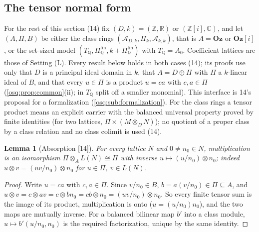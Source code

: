 \documentclass[11pt,letterpaper]{article}
\numberwithin{equation}{section}
\newtheorem{lemma}[lemma]{Lemma}
\theoremstyle{definition}
\theoremstyle{remark}
\theoremstyle{plain}
\newcommand{\Oz}{\mathbf{Oz}}
\newcommand{\GOz}{\Oz[i]}
\newcommand{\Z}{\mathbb Z}
\newcommand{\Q}{\mathbb Q}
\newcommand{\R}{\mathbb R}
\newcommand{\C}{\mathbb C}
\newcommand{\A}{\mathcal A}          %
\newcommand{\src}[1]{\textup{\textsf{[#1]}}}
\begin{document}
\subsection{The tensor normal form}\label{osq:tn:sub:tensor}

For the rest of this section (14) fix $(D,k)=(\Z,\R)$ or $(\Z[i],\C)$, and let $(A,\Pi,B)$ be either the class rings
$(\A_{D,k},\Pi_k,\A_{k,k})$, that is $A=\Oz$ or $\GOz$, or the set-sized model $(T_\Q,\Pi^{\mathrm{fin}}_\Q,k+\Pi^{\mathrm{fin}}_\Q)$
with $T_\Q=A_0$. Coefficient lattices are those of Setting (L). Every result below holds in both cases (14); its proofs use
only that $D$ is a principal ideal domain in $k$, that $A=D\oplus\Pi$ with $\Pi$ a $k$-linear ideal of $B$, and that every
$u\in\Pi$ is a product $u=ca$ with $c,a\in\Pi$ (\cref{osq:prop:common}(ii); in $T_\Q$ split off a smaller monomial). This
interface is 14's proposal for a formalization (\cref{osq:sub:formalization}). For the class rings a tensor product means an
explicit carrier with the balanced universal property proved by finite identities (for two lattices,
$\Pi\times(M\otimes_DN)$); no quotient of a proper class by a class relation and no class colimit is used (14).

\begin{lemma}[Absorption \src{14}]\label{osq:tn:lem:absorption}
For every lattice $N$ and $0\ne n_0\in N$, multiplication is an isomorphism $\Pi\otimes_AL(N)\cong\Pi$ with inverse
$u\mapsto(u/n_0)\otimes n_0$; indeed $u\otimes v=(uv/n_0)\otimes n_0$ for $u\in\Pi$, $v\in L(N)$.
\end{lemma}
\begin{proof}
Write $u=ca$ with $c,a\in\Pi$. Since $v/n_0\in B$, $b=a(v/n_0)\in\Pi\subseteq A$, and
$u\otimes v=c\otimes av=c\otimes bn_0=cb\otimes n_0=(uv/n_0)\otimes n_0$. So every finite tensor sum is the image of its
product, multiplication is onto ($u=(u/n_0)n_0$), and the two maps are mutually inverse. For a balanced bilinear map $b'$ into
a class module, $u\mapsto b'(u/n_0,n_0)$ is the required factorization, unique by the same identity.
\end{proof}
\end{document}

